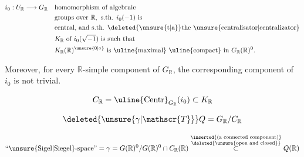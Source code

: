 \[
\begin{aligned}
i_0:U_{\mathbb{R}}\longrightarrow G_{\mathbb{R}}\quad &\text{homomorphism of algebraic}\\
&\text{groups over }\mathbb{R},\ \text{s.th. }i_0(-1)\text{ is}\\
&\text{central, and s.th. \deleted{\unsure{t|a}}the \unsure{centralisator|centralizator}}\\
&K_{\mathbb{R}}\text{ of }i_0(\sqrt{-1})\text{ is such that}\\
&K_{\mathbb{R}}(\mathbb{R})^{\unsure{0|\circ}}\text{ is \uline{maximal} \uline{compact} in }G_{\mathbb{R}}(\mathbb{R})^{0}.
\end{aligned}
\]

Moreover, for every $\mathbb{R}$-simple component of $G_{\mathbb{R}}$, the corresponding component of $i_0$ is not trivial.

\[
C_{\mathbb{R}}=\text{\uline{Centr}}_{G_{\mathbb{R}}}(i_0)\subset K_{\mathbb{R}}
\]

\[
\deleted{\unsure{\gamma|\mathscr{T}}}Q=G_{\mathbb{R}}/C_{\mathbb{R}}
\]

\[
\text{``\unsure{Sigel|Siegel}-space''}=\gamma=G(\mathbb{R})^{0}/G(\mathbb{R})^{0}\cap C_{\mathbb{R}}(\mathbb{R})
\overset{\substack{\inserted{\text{(a connected component)}}\\ \deleted{\text{\unsure{open and closed}}}}}{\subset}Q(\mathbb{R})
\]

